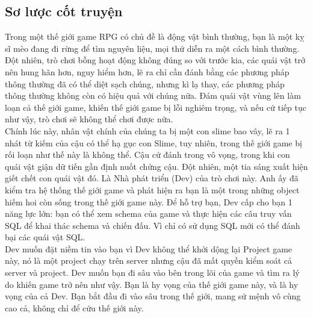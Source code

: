 \subsection{Sơ lược cốt truyện}
\hspace*{1cm} Trong một thế giới game RPG có chủ đề là động vật bình thường, bạn là một kỵ sĩ mèo đang đi rừng để tìm nguyên liệu, mọi thứ diễn ra một cách bình thường. \\
\hspace*{1cm} Đột nhiên, trò chơi bỗng hoạt động không đúng so với trước kia, các quái vật trở nên hung hãn hơn, nguy hiểm hơn, lẽ ra chỉ cần đánh bằng các phương pháp thông thường đã có thể diệt sạch chúng, nhưng kì lạ thay, các phương pháp thông thường không còn có hiệu quả với chúng nữa. Đám quái vật vùng lên làm loạn cả thế giới game, khiến thế giới game bị lỗi nghiêm trọng, và nếu cứ tiếp tục như vậy, trò chơi sẽ không thể chơi được nữa.\\
\hspace*{1cm} Chính lúc này, nhân vật chính của chúng ta bị một con slime bao vây, lẽ ra 1 nhát từ kiếm của cậu có thể hạ gục con Slime, tuy nhiên, trong thế giới game bị rối loạn như thế này là không thể. Cậu cứ đánh trong vô vọng, trong khi con quái vật giận dữ tiến gần định nuốt chửng cậu. Đột nhiên, một tia sáng xuất hiện giết chết con quái vật đó. Là Nhà phát triển (Dev) của trò chơi này. Anh ấy đã kiểm tra hệ thống thế giới game và phát hiện ra bạn là một trong những object hiếm hoi còn sống trong thế giới game này. Để hỗ trợ bạn, Dev cấp cho bạn 1 năng lực lớn: bạn có thể xem schema của game và thực hiện các câu truy vấn SQL để khai thác schema và chiến đấu. Vì chỉ có sử dụng SQL mới có thể đánh bại các quái vật SQL. \\
\hspace*{1cm} Dev muốn đặt niềm tin vào bạn vì Dev không thể khởi dộng lại Project game này, nó là một project chạy trên server nhưng cậu đã mất quyền kiểm soát cả server và project. Dev muốn bạn đi sâu vào bên trong lõi của game và tìm ra lý do khiến game trở nên như vậy. Bạn là hy vọng của thế giới game này, và là hy vọng của cả Dev. Bạn bắt đầu đi vào sâu trong thế giới, mang sứ mệnh vô cùng cao cả, không chỉ để cứu thế giới này.

